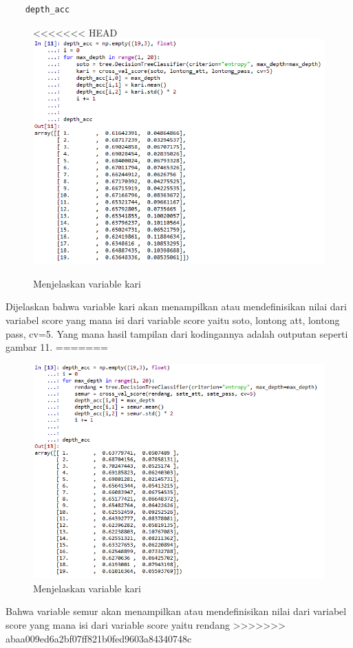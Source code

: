 \begin{enumerate}
\begin{verbatim}
	depth_acc
\end{verbatim}
\begin{figure}[ht]
\centering
<<<<<<< HEAD
\includegraphics[scale=0.6]{figures/lontong/11.png}
\caption{Menjelaskan variable kari}
\end{figure}
\par
	Dijelaskan bahwa variable kari akan menampilkan atau mendefinisikan nilai dari variabel score yang mana isi dari variable score yaitu soto, lontong att, lontong pass, cv=5. Yang mana hasil tampilan dari kodingannya adalah outputan seperti gambar 11.
=======
\begin{figure}[ht]
\centering
\includegraphics[scale=0.6]{figures/410.png}
\caption{Menjelaskan variable kari}
\end{figure}
\par
	Bahwa variable semur akan menampilkan atau mendefinisikan nilai dari variabel score yang mana isi dari variable score yaitu rendang
>>>>>>> abaa009ed6a2bf07ff821b0fed9603a84340748c


\end{enumerate}
